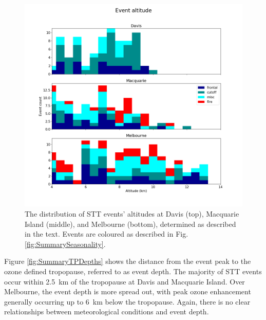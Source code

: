 \documentclass[acp, manuscript]{copernicus} %
\begin{document}
  \begin{figure}[t]
    \includegraphics[width=12cm]{figures/summary_altitude.png}
    \caption{The distribution of STT events' altitudes at Davis (top), Macquarie Island (middle), and Melbourne (bottom), determined as described in the text.
    Events are coloured as described in Fig. \ref{fig:SummarySeasonality}.}
    \label{fig:SummaryAltitudes}
  \end{figure}

  Figure \ref{fig:SummaryTPDepths} shows the distance from the event peak to the ozone defined tropopause, referred to as event depth.
  The majority of STT events occur within 2.5~km of the tropopause at Davis and Macquarie Island. 
  Over Melbourne, the event depth is more spread out, with peak ozone enhancement generally occurring up to 6~km below the tropopause.
  Again, there is no clear relationships between meteorological conditions and event depth.
\end{document}
